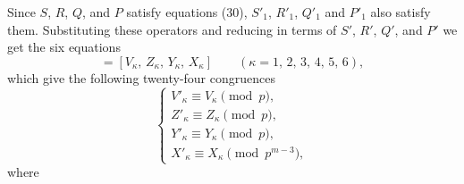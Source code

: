 \documentclass[oneside]{article}
\begin{document}
Since $S$, $R$, $Q$, and $P$ satisfy equations (30), $S'_1$, $R'_1$, $Q'_1$
and $P'_1$ also satisfy them. Substituting these operators and reducing in
terms of $S'$, $R'$, $Q'$, and $P'$ we get the six equations
\begin{equation}
[V'_\kappa,\, Z'_\kappa,\, Y'_\kappa,\, X'_\kappa] = [V_\kappa,\, Z_\kappa,\,
Y_\kappa,\, X_\kappa] \qquad (\kappa = 1,\, 2,\, 3,\, 4,\, 5,\, 6), %
\end{equation}
\noindent which give the following twenty-four congruences
\begin{equation}
  \begin{cases}
  V'_\kappa \equiv V_\kappa \pmod{p}, \\
  Z'_\kappa \equiv Z_\kappa \pmod{p}, \\
  Y'_\kappa \equiv Y_\kappa \pmod{p}, \\
  X'_\kappa \equiv X_\kappa \pmod{p^{m-3}},
  \end{cases} %
\end{equation}
\noindent where
\end{document}
